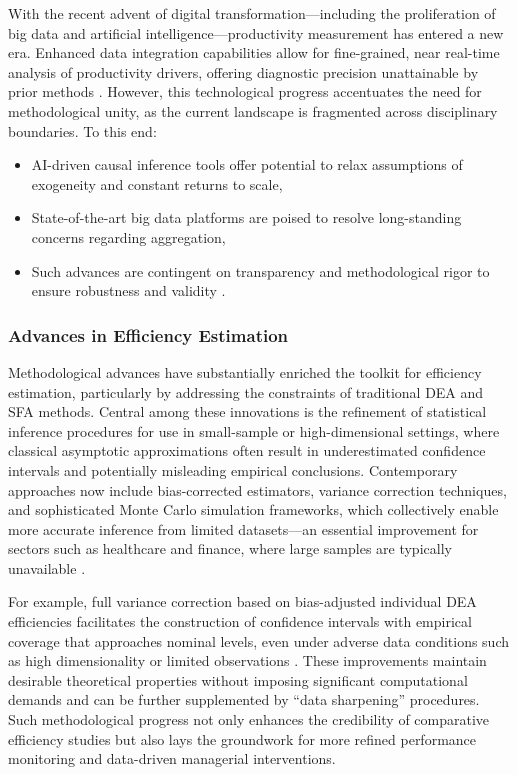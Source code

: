 \documentclass[sigconf]{acmart}
\begin{document}
With the recent advent of digital transformation—including the proliferation of big data and artificial intelligence—productivity measurement has entered a new era. Enhanced data integration capabilities allow for fine-grained, near real-time analysis of productivity drivers, offering diagnostic precision unattainable by prior methods \cite{ref86}. However, this technological progress accentuates the need for methodological unity, as the current landscape is fragmented across disciplinary boundaries. To this end:

\begin{itemize}
    \item AI-driven causal inference tools offer potential to relax assumptions of exogeneity and constant returns to scale,
    \item State-of-the-art big data platforms are poised to resolve long-standing concerns regarding aggregation,
    \item Such advances are contingent on transparency and methodological rigor to ensure robustness and validity \cite{ref86}.
\end{itemize}

\subsubsection{Advances in Efficiency Estimation}

Methodological advances have substantially enriched the toolkit for efficiency estimation, particularly by addressing the constraints of traditional DEA and SFA methods. Central among these innovations is the refinement of statistical inference procedures for use in small-sample or high-dimensional settings, where classical asymptotic approximations often result in underestimated confidence intervals and potentially misleading empirical conclusions. Contemporary approaches now include bias-corrected estimators, variance correction techniques, and sophisticated Monte Carlo simulation frameworks, which collectively enable more accurate inference from limited datasets—an essential improvement for sectors such as healthcare and finance, where large samples are typically unavailable \cite{ref87}.

For example, full variance correction based on bias-adjusted individual DEA efficiencies facilitates the construction of confidence intervals with empirical coverage that approaches nominal levels, even under adverse data conditions such as high dimensionality or limited observations \cite{ref87}. These improvements maintain desirable theoretical properties without imposing significant computational demands and can be further supplemented by ``data sharpening'' procedures. Such methodological progress not only enhances the credibility of comparative efficiency studies but also lays the groundwork for more refined performance monitoring and data-driven managerial interventions.
\end{document}

